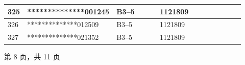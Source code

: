 \documentclass[UTF8,10pt,a4paper,fontset=fandol]{ctexart}
\newcommand{\fieldvalue}[1]{#1}
\begin{document}
\begin{tabular}{|p{0.08\linewidth}|p{0.28\linewidth}|p{0.19\linewidth}|p{0.19\linewidth}|p{0.18\linewidth}|}
325 &
\fieldvalue{**************001245} &
\fieldvalue{B3--5} &
\fieldvalue{1121809} & \\ \hline
326 &
\fieldvalue{**************012509} &
\fieldvalue{B3--5} &
\fieldvalue{1121809} & \\ \hline
327 &
\fieldvalue{**************021352} &
\fieldvalue{B3--5} &
\fieldvalue{1121809} & \\ \hline
\end{tabular}

\begin{center}
第 8 页，共 11 页
\end{center}

\newpage
\end{document}
